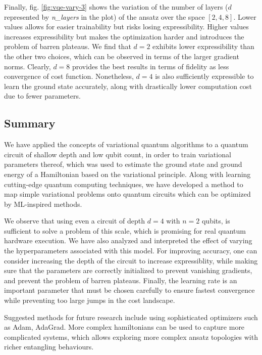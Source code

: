 \documentclass[11pt,a4paper]{article}
\begin{document}
Finally, fig. \ref{fig:vqe-vary-3} shows the variation of the number of layers ($d$ represented by \textit{n\_layers} in the plot) of the ansatz over the space $[2, 4, 8]$. Lower values allows for easier trainability but risks losing expressibility. Higher values increases expressibility but makes the optimization harder and introduces the problem of barren plateaus. We find that $d = 2$ exhibits lower expressibility than the other two choices, which can be observed in terms of the larger gradient norms. Clearly, $d = 8$ provides the best results in terms of fidelity as less convergence of cost function. Nonetheless, $d = 4$ is also sufficiently expressible to learn the ground state accurately, along with drastically lower computation cost due to fewer parameters.

\subsection{Summary}

We have applied the concepts of variational quantum algorithms to a quantum circuit of shallow depth and low qubit count, in order to train variational parameters thereof, which was used to estimate the ground state and ground energy of a Hamiltonian based on the variational principle. Along with learning cutting-edge quantum computing techniques, we have developed a method to map simple variational problems onto quantum circuits which can be optimized by ML-inspired methods.

We observe that using even a circuit of depth $d=4$ with $n = 2$ qubits, is sufficient to solve a problem of this scale, which is promising for real quantum hardware execution. We have also analyzed and interpreted the effect of varying the hyperparameters associated with this model. For improving accuracy, one can consider increasing the depth of the circuit to increase expressiblity, while making sure that the parameters are correctly initialized to prevent vanishing gradients, and prevent the problem of barren plateaus. Finally, the learning rate is an important parameter that must be chosen carefully to ensure fastest convergence while preventing too large jumps in the cost landscape.

Suggested methods for future research include using sophisticated optimizers such as Adam, AdaGrad. More complex hamiltonians can be used to capture more complicated systems, which allows exploring more complex ansatz topologies with richer entangling behaviours.
\end{document}
